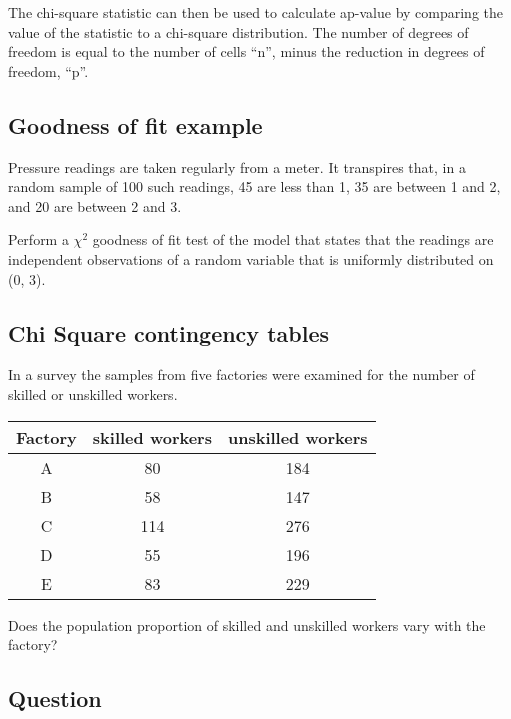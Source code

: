 \documentclass[00-IntroStatsMaster.tex]{subfiles}
\begin{document}
The chi-square statistic can then be used to calculate ap-value by comparing the value of the statistic to a chi-square distribution. The number of degrees of freedom is equal to the number of cells ``n'', minus the reduction in degrees of freedom, ``p''.

\subsection{ Goodness of fit example}


Pressure readings are taken regularly from a meter. It transpires that, in a random
sample of 100 such readings, 45 are less than 1, 35 are between 1 and 2, and 20 are
between 2 and 3.

Perform a $\chi^2$ goodness of fit test of the model that states that the readings are
independent observations of a random variable that is uniformly distributed on (0, 3).


\subsection{Chi Square contingency tables}


In a survey the samples from five factories were examined for the
number of skilled or unskilled workers.


\begin{tabular}{|c|c|c|}
	\hline
	Factory & skilled workers & unskilled workers \\ \hline
	A & 80 & 184 \\
	B & 58 & 147 \\
	C & 114 & 276 \\
	D & 55 & 196 \\
	E & 83 & 229 \\
	\hline
\end{tabular}

Does the population proportion of skilled and unskilled workers vary with the factory?


\subsection{Question}
\end{document}
